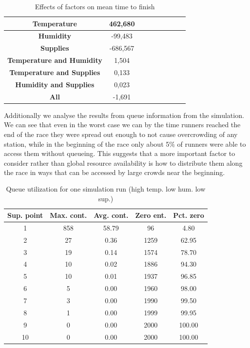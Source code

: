 \documentclass[conference]{IEEEtran}
\begin{document}
\begin{table}[htbp]
\caption{Effects of factors on mean time to finish}
\begin{center}
\begin{tabular}{|c|c|c|c|c|c|c|c|c|}
\hline
\textbf{Temperature} & 462,680\\
\hline
\textbf{Humidity} & -99,483\\
\hline
\textbf{Supplies} & -686,567\\
\hline
\textbf{Temperature and Humidity} & 1,504\\
\hline
\textbf{Temperature and Supplies}& 0,133\\
\hline
\textbf{Humidity and Supplies}&0,023\\
\hline
\textbf{All}&-1,691\\
\hline
\end{tabular}
\label{tab:results}
\end{center}
\end{table}

Additionally we analyse the results from queue information from the simulation. We can see that even in the worst case we can by the time runners reached the end of the race they were spread out enough to not cause overcrowding of any station, while in the beginning of the race only about 5\% of runners were able to access them without queueing. This suggests that a more important factor to consider rather than global resource availability is how to distribute them along the race in ways that can be accessed by large crowds near the beginning.

\begin{table}[htbp]
\caption{Queue utilization for one simulation run (high temp. low hum. low sup.)}
\begin{center}
\begin{tabular}{|c|c|c|c|c|}
\hline
\textbf{Sup. point}&\textbf{Max. cont.}&\textbf{Avg. cont.}&\textbf{Zero ent.}&\textbf{Pct. zero}\\
\hline
1&858&58.79&96&4.80\\
\hline
2&27&0.36&1259&62.95\\
\hline
3&19&0.14&1574&78.70\\
\hline
4&10&0.02&1886&94.30\\
\hline
5&10&0.01&1937&96.85\\
\hline
6&5&0.00&1960&98.00\\
\hline
7&3&0.00&1990&99.50\\
\hline
8&1&0.00&1999&99.95\\
\hline
9&0&0.00&2000&100.00\\
\hline
10&0&0.00&2000&100.00\\
\hline
\end{tabular}
\label{tab:queue_results}
\end{center}
\end{table}
\end{document}
